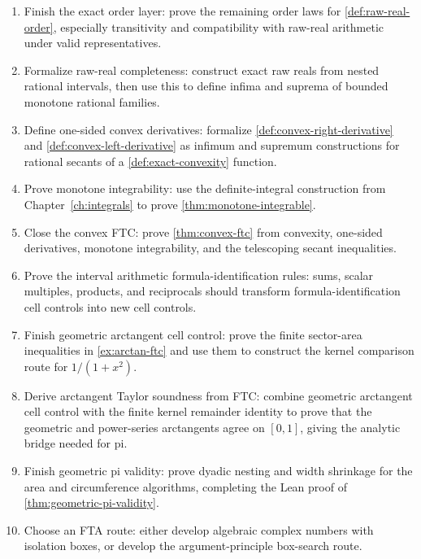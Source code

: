\begin{enumerate}
  \item Finish the exact order layer:
  prove the remaining order laws for \cref{def:raw-real-order}, especially
  transitivity and compatibility with raw-real arithmetic under valid
  representatives.

  \item Formalize raw-real completeness:
  construct exact raw reals from nested rational intervals, then use this to
  define infima and suprema of bounded monotone rational families.

  \item Define one-sided convex derivatives:
  formalize \cref{def:convex-right-derivative} and
  \cref{def:convex-left-derivative} as infimum and supremum constructions for
  rational secants of a \cref{def:exact-convexity} function.

  \item Prove monotone integrability:
  use the definite-integral construction from Chapter~\ref{ch:integrals} to
  prove \cref{thm:monotone-integrable}.

  \item Close the convex FTC:
  prove \cref{thm:convex-ftc} from convexity, one-sided derivatives,
  monotone integrability, and the telescoping secant inequalities.

  \item Prove the interval arithmetic formula-identification rules:
  sums, scalar multiples, products, and reciprocals should transform
  formula-identification cell controls into new cell controls.

  \item Finish geometric arctangent cell control:
  prove the finite sector-area inequalities in \cref{ex:arctan-ftc} and use
  them to construct the kernel comparison route for \(1/(1+x^2)\).

  \item Derive arctangent Taylor soundness from FTC:
  combine geometric arctangent cell control with the finite kernel remainder
  identity to prove that the geometric and power-series arctangents agree on
  \([0,1]\), giving the analytic bridge needed for pi.

  \item Finish geometric pi validity:
  prove dyadic nesting and width shrinkage for the area and circumference
  algorithms, completing the Lean proof of \cref{thm:geometric-pi-validity}.

  \item Choose an FTA route:
  either develop algebraic complex numbers with isolation boxes, or develop
  the argument-principle box-search route.
\end{enumerate}

